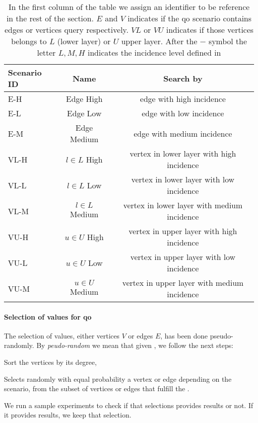 \begin{table}[H]
  \centering
  \begin{tabular}{|l|c|c|}
    \hline
    \textbf{Scenario ID} & \textbf{Name} & \textbf{Search by}\\
    \hline
    E-H & Edge High & edge with high incidence \\
    \hline
    E-L & Edge Low & edge with low incidence \\
    \hline
    E-M & Edge Medium & edge with medium incidence \\
    \hline
    VL-H & $l \in L$ High & vertex in lower layer with high incidence \\
    \hline
    VL-L & $l \in L$ Low & vertex in lower layer with low incidence \\
    \hline
    VL-M & $l \in L$ Medium & vertex in lower layer with medium incidence \\
    \hline
    VU-H & $u \in U$ High & vertex in upper layer with high incidence \\
    \hline
    VU-L & $u \in U$ Low & vertex in upper layer with low incidence \\
    \hline
    VU-M & $u \in U$ Medium & vertex in upper layer with medium incidence \\
    \hline
  \end{tabular}
  \caption[Experiment Data Setup for experiments]{In the first column of the table we assign an identifier to be reference in the rest of the section. $E$ and $V$ indicates if the \acrshort{qo} scenario contains edges or vertices query respectively. $VL$ or $VU$ indicates if those vertices belongs to $L$ (lower layer) or $U$ upper layer. After the $-$ symbol the letter $L,M,H$ indicates the incidence level defined in }
  \label{table:exp:data-setup}
  \end{table}

\paragraph{Selection of values for \acrshort{qo}}\label{sub:exp:sel-vals} The selection of values, either vertices $V$ or edges $E$, has been done pseudo-randomly.
By \emph{peudo-random} we mean that given , we follow the next steps: \begin{inparaenum}[\bf i\upshape)]
  \item Sort the vertices by its degree,
  \item Selects randomly with equal probability a vertex or edge depending on the scenario, from the subset of vertices or edges that fulfill the .
  \item We run a sample experiments to check if that selections provides results or not. If it provides results, we keep that selection.
\end{inparaenum}
  
